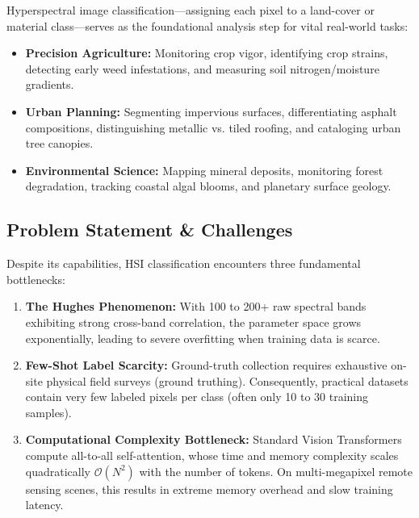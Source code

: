 \documentclass[conference]{IEEEtran}
\begin{document}
Hyperspectral image classification---assigning each pixel to a land-cover or material class---serves as the foundational analysis step for vital real-world tasks:
\begin{itemize}
    \item \textbf{Precision Agriculture:} Monitoring crop vigor, identifying crop strains, detecting early weed infestations, and measuring soil nitrogen/moisture gradients.
    \item \textbf{Urban Planning:} Segmenting impervious surfaces, differentiating asphalt compositions, distinguishing metallic vs. tiled roofing, and cataloging urban tree canopies.
    \item \textbf{Environmental Science:} Mapping mineral deposits, monitoring forest degradation, tracking coastal algal blooms, and planetary surface geology.
\end{itemize}

\subsection{Problem Statement \& Challenges}
Despite its capabilities, HSI classification encounters three fundamental bottlenecks:
\begin{enumerate}
    \item \textbf{The Hughes Phenomenon:} With 100 to 200+ raw spectral bands exhibiting strong cross-band correlation, the parameter space grows exponentially, leading to severe overfitting when training data is scarce.
    \item \textbf{Few-Shot Label Scarcity:} Ground-truth collection requires exhaustive on-site physical field surveys (ground truthing). Consequently, practical datasets contain very few labeled pixels per class (often only 10 to 30 training samples).
    \item \textbf{Computational Complexity Bottleneck:} Standard Vision Transformers compute all-to-all self-attention, whose time and memory complexity scales quadratically $\mathcal{O}(N^2)$ with the number of tokens. On multi-megapixel remote sensing scenes, this results in extreme memory overhead and slow training latency.
\end{enumerate}
\end{document}
